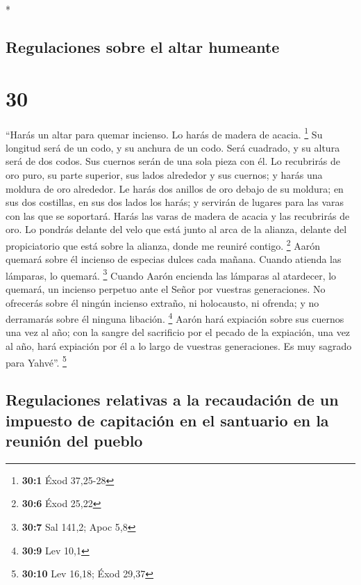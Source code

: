 \begin{paracol}{2}
\begin{otherlanguage}{english}
\end{otherlanguage}

\switchcolumn[0]*

\hypertarget{regulaciones-sobre-el-altar-humeante}{%
\subsection{Regulaciones sobre el altar
humeante}\label{regulaciones-sobre-el-altar-humeante}}

\hypertarget{section-58}{%
\section{30}\label{section-58}}

 ``Harás un altar para quemar incienso. Lo harás de madera
de acacia. \footnote{\textbf{30:1} Éxod 37,25-28}  Su
longitud será de un codo, y su anchura de un codo. Será cuadrado, y su
altura será de dos codos. Sus cuernos serán de una sola pieza con él.
 Lo recubrirás de oro puro, su parte superior, sus lados
alrededor y sus cuernos; y harás una moldura de oro alrededor.
 Le harás dos anillos de oro debajo de su moldura; en sus
dos costillas, en sus dos lados los harás; y servirán de lugares para
las varas con las que se soportará.  Harás las varas de
madera de acacia y las recubrirás de oro.  Lo pondrás
delante del velo que está junto al arca de la alianza, delante del
propiciatorio que está sobre la alianza, donde me reuniré contigo.
\footnote{\textbf{30:6} Éxod 25,22}  Aarón quemará sobre
él incienso de especias dulces cada mañana. Cuando atienda las lámparas,
lo quemará. \footnote{\textbf{30:7} Sal 141,2; Apoc 5,8} 
Cuando Aarón encienda las lámparas al atardecer, lo quemará, un incienso
perpetuo ante el Señor por vuestras generaciones.  No
ofrecerás sobre él ningún incienso extraño, ni holocausto, ni ofrenda; y
no derramarás sobre él ninguna libación. \footnote{\textbf{30:9} Lev
  10,1}  Aarón hará expiación sobre sus cuernos una vez
al año; con la sangre del sacrificio por el pecado de la expiación, una
vez al año, hará expiación por él a lo largo de vuestras generaciones.
Es muy sagrado para Yahvé''. \footnote{\textbf{30:10} Lev 16,18; Éxod
  29,37}

\hypertarget{regulaciones-relativas-a-la-recaudaciuxf3n-de-un-impuesto-de-capitaciuxf3n-en-el-santuario-en-la-reuniuxf3n-del-pueblo}{%
\subsection{Regulaciones relativas a la recaudación de un impuesto de
capitación en el santuario en la reunión del
pueblo}\label{regulaciones-relativas-a-la-recaudaciuxf3n-de-un-impuesto-de-capitaciuxf3n-en-el-santuario-en-la-reuniuxf3n-del-pueblo}}


\end{paracol}
